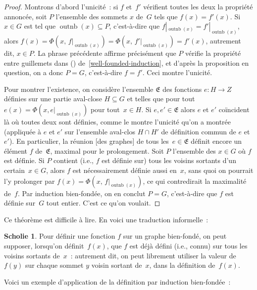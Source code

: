 \documentclass[12pt,a4paper]{article}
\theoremstyle{definition}
\newtheorem{scho}[comcnt]{Scholie}
\newcommand{\outnb}{\operatorname{outnb}}
\begin{document}
\begin{proof}
Montrons d'abord l'unicité : si $f$ et $f'$ vérifient toutes les deux
la propriété annoncée, soit $P$ l'ensemble des sommets $x$ de $G$ tels
que $f(x) = f'(x)$.  Si $x \in G$ est tel que $\outnb(x)
\subseteq P$, c'est-à-dire que $f|_{\outnb(x)} =
f'|_{\outnb(x)}$, alors $f(x) = \Phi(x,\,
f|_{\outnb(x)}) = \Phi(x,\, f'|_{\outnb(x)}) = f'(x)$,
autrement dit, $x\in P$.  La phrase précédente affirme précisément que
$P$ vérifie la propriété entre guillemets dans (\ddag)
de \ref{well-founded-induction}, et d'après la proposition en
question, on a donc $P = G$, c'est-à-dire $f = f'$.  Ceci montre
l'unicité.

Pour montrer l'existence, on considère l'ensemble $\mathfrak{E}$ des
fonctions $e\colon H\to Z$ définies sur une partie aval-close $H
\subseteq G$ et telles que pour tout $e(x) = \Phi(x, e|_{\outnb(x)})$
pour tout $x\in H$.  Si $e,e' \in \mathfrak{E}$ alors $e$ et $e'$
coïncident là où toutes deux sont définies, comme le montre l'unicité
qu'on a montrée (appliquée à $e$ et $e'$ sur l'ensemble aval-clos $H
\cap H'$ de définition commun de $e$ et $e'$).  En particulier, la
réunion [des graphes] de tous les $e\in\mathfrak{E}$ définit encore un
élément $f$ de $\mathfrak{E}$, maximal pour le prolongement.  Soit $P$
l'ensemble des $x \in G$ où $f$ est définie.  Si $P$ contient (i.e.,
$f$ est définie sur) tous les voisins sortants d'un certain $x\in G$,
alors $f$ est nécessairement définie aussi en $x$, sans quoi on
pourrait l'y prolonger par $f(x) = \Phi(x,\, f|_{\outnb(x)})$, ce qui
contredirait la maximalité de $f$.  Par induction bien-fondée, on en
conclut $P = G$, c'est-à-dire que $f$ est définie sur $G$ tout entier.
C'est ce qu'on voulait.
\end{proof}

Ce théorème est difficile à lire.  En voici une traduction
informelle :

\begin{scho}\label{scholion-well-founded-definition}
Pour définir une fonction $f$ sur un graphe bien-fondé, on peut
supposer, lorsqu'on définit $f(x)$, que $f$ est déjà défini (i.e.,
connu) sur tous les voisins sortants de $x$ : autrement dit, on
peut librement utiliser la valeur de $f(y)$ sur chaque sommet $y$
voisin sortant de $x$, dans la définition de $f(x)$.
\end{scho}

Voici un exemple d'application de la définition par induction
bien-fondée :
\end{document}
